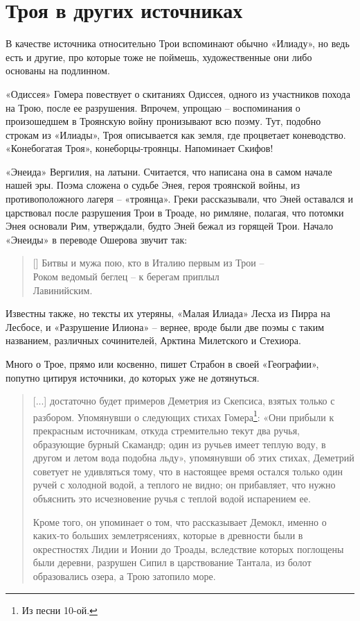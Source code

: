\chapter{Троя в других источниках}

В качестве источника относительно Трои вспоминают обычно «Илиаду», но ведь есть и другие, про которые тоже не поймешь, художественные они либо основаны на подлинном.

«Одиссея» Гомера повествует о скитаниях Одиссея, одного из участников похода на Трою, после ее разрушения. Впрочем, упрощаю – воспоминания о произошедшем в Троянскую войну пронизывают всю поэму. Тут, подобно строкам из «Илиады», Троя описывается как земля, где процветает коневодство. «Конебогатая Троя», конеборцы-троянцы. Напоминает Скифов!

«Энеида» Вергилия, на латыни. Считается, что написана она в самом начале нашей эры. Поэма сложена о судьбе Энея, героя троянской войны, из противоположного лагеря – «троянца». Греки рассказывали, что Эней оставался и царствовал после разрушения Трои в Троаде, но римляне, полагая, что потомки Энея основали Рим, утверждали, будто Эней бежал из горящей Трои. Начало «Энеиды» в переводе Ошерова звучит так:

\settowidth{\versewidth}{Битвы и мужа пою, кто в Италию первым из Трои – } 
\begin{verse}[\versewidth]
Битвы и мужа пою, кто в Италию первым из Трои – \\
Роком ведомый беглец – к берегам приплыл\\ Лавинийским.
\end{verse}

Известны также, но тексты их утеряны, «Малая Илиада» Лесха из Пирра на Лесбосе, и «Разрушение Илиона» – вернее, вроде были две поэмы с таким названием, различных сочинителей, Арктина Милетского и Стехиора.

Много о Трое, прямо или косвенно, пишет Страбон в своей «Географии», попутно цитируя источники, до которых уже не дотянуться.

\begin{quotation}
[...] достаточно будет примеров Деметрия из Скепсиса, взятых только с разбором. Упомянувши о следующих стихах Гомера\footnote{Из песни 10-ой.}: «Они прибыли к прекрасным источникам, откуда стремительно текут два ручья, образующие бурный Скамандр; один из ручьев имеет теплую воду, в другом и летом вода подобна льду», упомянувши об этих стихах, Деметрий советует не удивляться тому, что в настоящее время остался только один ручей с холодной водой, а теплого не видно; он прибавляет, что нужно объяснить это исчезновение ручья с теплой водой испарением ее.

Кроме того, он упоминает о том, что рассказывает Демокл, именно о каких-то больших землетрясениях, которые в древности были в окрестностях Лидии и Ионии до Троады, вследствие которых поглощены были деревни, разрушен Сипил в царствование Тантала, из болот образовались озера, а Трою затопило море.
\end{quotation}

